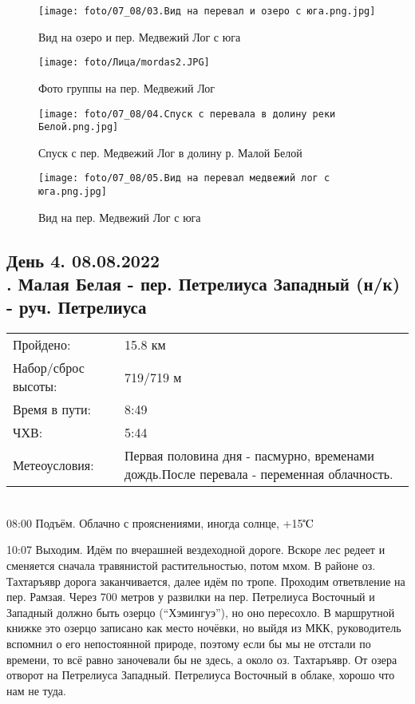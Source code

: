 \begin{figure}
    \centering
    \texttt{[image: foto/07\_08/03.Вид на перевал и озеро с юга.png.jpg]}
    \caption{Вид на озеро и пер. Медвежий Лог с юга}
\end{figure}

\begin{figure}
    \centering
    \texttt{[image: foto/Лица/mordas2.JPG]}
    \caption{Фото группы на пер. Медвежий Лог}
\end{figure}

\begin{figure}
    \centering
    \texttt{[image: foto/07\_08/04.Спуск с перевала в долину реки Белой.png.jpg]}
    \caption{Спуск с пер. Медвежий Лог в долину р. Малой Белой}
\end{figure}

\begin{figure}[H]
    \centering
    \texttt{[image: foto/07\_08/05.Вид на перевал медвежий лог с юга.png.jpg]}
    \caption{Вид на пер. Медвежий Лог с юга}
\end{figure}

\subsection{День 4. 08.08.2022\\
. Малая Белая - пер. Петрелиуса Западный (н/к) - руч. Петрелиуса}
\begin{tabular}{l p{12cm}}
\hline
Пройдено: & 15.8 км\\
Набор/сброс высоты: & 719/719 м\\
Время в пути: & 8:49\\
ЧХВ: & 5:44\\
Метеоусловия: & Первая половина дня - пасмурно, временами дождь.\hfill \break После перевала - переменная облачность.\\
\hline
\end{tabular}\\

08:00 Подъём.
Облачно с прояснениями, иногда солнце, +15$\tccentigrade$

10:07 Выходим.
Идём по вчерашней вездеходной дороге. Вскоре лес редеет и сменяется сначала травянистой растительностью, потом мхом.
В районе оз. Тахтаръявр дорога заканчивается, далее идём по тропе.
Проходим ответвление на пер. Рамзая. Через 700 метров у развилки на пер. Петрелиуса Восточный и Западный
должно быть озерцо (``Хэмингуэ''), но оно пересохло. В маршрутной книжке это озерцо записано как место ночёвки,
но выйдя из МКК, руководитель вспомнил о его непостоянной природе, поэтому если бы мы не отстали по времени,
то всё равно заночевали бы не здесь, а около оз. Тахтаръявр.
От озера отворот на Петрелиуса Западный. Петрелиуса Восточный в облаке, хорошо что нам не туда.

